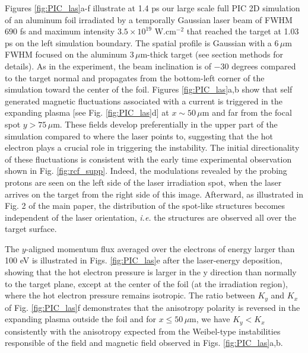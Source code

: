 \documentclass[aps,showpacs,superscriptaddress]{revtex4}
\begin{document}
Figures \ref{fig:PIC_las}a-f illustrate at 1.4 ps our large scale full PIC 2D simulation of an aluminum foil irradiated by a  temporally Gaussian laser beam of  FWHM $690$ fs and maximum intensity $3.5 \times 10^{19}$ W.cm$^{-2}$ that reached the target at 1.03 ps on the left simulation boundary. The spatial profile is Gaussian with a $6\, \mu$m FWHM focused on the aluminum $3\,\mu$m-thick target (see section methods for details). 
As in the experiment, the beam inclination is of  $-30$ degrees compared to the target normal and propagates from the bottom-left corner of the simulation toward the center of the foil.
Figures \ref{fig:PIC_las}a,b show that self generated magnetic fluctuations associated with a current is triggered in the expanding plasma [see Fig. \ref{fig:PIC_las}d] at $x\sim 50 \, \mu$m and far from the focal spot $y>75\, \mu$m. These fields develop preferentially in the upper part of the simulation compared to where the laser points to, suggesting that the  hot electron plays a crucial role in triggering the instability. The initial directionality of these fluctuations is consistent with the early time experimental observation shown in Fig. \ref{fig:rcf_supp}.
Indeed, the modulations revealed by the probing protons are seen on the left side of the laser irradiation spot, when the laser arrives on the target from the right side of this image. 
Afterward, as illustrated in Fig. 2 of the main paper, the distribution of the spot-like structures   becomes independent of the laser orientation, \emph{i.e.} the structures are observed all over the target surface.

The $y$-aligned momentum flux  averaged over the electrons of energy larger than 100 eV is  illustrated  in Figs.  \ref{fig:PIC_las}e after the laser-energy deposition, showing that the hot electron pressure is larger in the y direction than normally to the target plane, except at the center of the foil (at the irradiation region), where the hot electron pressure remains isotropic. 
The ratio between $K_y$ and $K_x$ of Fig. \ref{fig:PIC_las}f demonstrates that  the anisotropy polarity is reversed  in the expanding plasma outside the foil and for $x \le 50\, \mu$m, we have $K_y < K_x$ consistently with the anisotropy expected from the Weibel-type instabilities responsible of the field and magnetic field observed in Figs.  \ref{fig:PIC_las}a,b.
\end{document}
